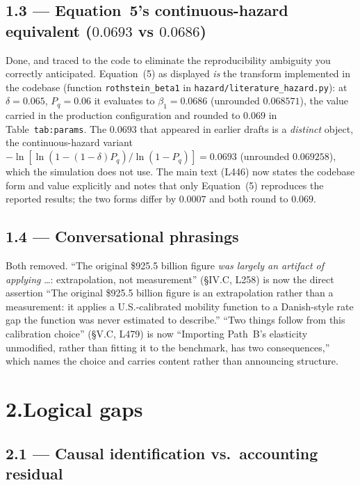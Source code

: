 \documentclass[11pt]{article}
\newcommand{\mlabel}[1]{\texttt{#1}}
\newcommand{\run}[1]{\texttt{#1}}
\begin{document}
\subsection*{1.3 --- Equation~5's continuous-hazard equivalent ($0.0693$ vs $0.0686$)}

Done, and traced to the code to eliminate the reproducibility ambiguity you
correctly anticipated. Equation~(5) as displayed \emph{is} the transform
implemented in the codebase (function \run{rothstein\_beta1} in
\run{hazard/literature\_hazard.py}): at $\delta = 0.065$, $P_q = 0.06$ it
evaluates to $\beta_1 = 0.0686$ (unrounded $0.068571$), the value carried in
the production configuration and rounded to $0.069$ in Table~\mlabel{tab:params}.
The $0.0693$ that appeared in earlier drafts is a \emph{distinct} object, the
continuous-hazard variant $-\ln[\ln(1-(1-\delta)P_q)/\ln(1-P_q)] = 0.0693$
(unrounded $0.069258$), which the simulation does not use. The main text (L446)
now states the codebase form and value explicitly and notes that only
Equation~(5) reproduces the reported results; the two forms differ by $0.0007$
and both round to $0.069$.

\subsection*{1.4 --- Conversational phrasings}

Both removed. ``The original \$925.5 billion figure \emph{was largely an
artifact of applying} \ldots: extrapolation, not measurement'' (\S IV.C, L258)
is now the direct assertion ``The original \$925.5 billion figure is an
extrapolation rather than a measurement: it applies a U.S.-calibrated mobility
function to a Danish-style rate gap the function was never estimated to
describe.'' ``Two things follow from this calibration choice'' (\S V.C, L479) is
now ``Importing Path~B's elasticity unmodified, rather than fitting it to the
benchmark, has two consequences,'' which names the choice and carries content
rather than announcing structure.

\section*{2.\quad Logical gaps}

\subsection*{2.1 --- Causal identification vs.\ accounting residual}
\end{document}
